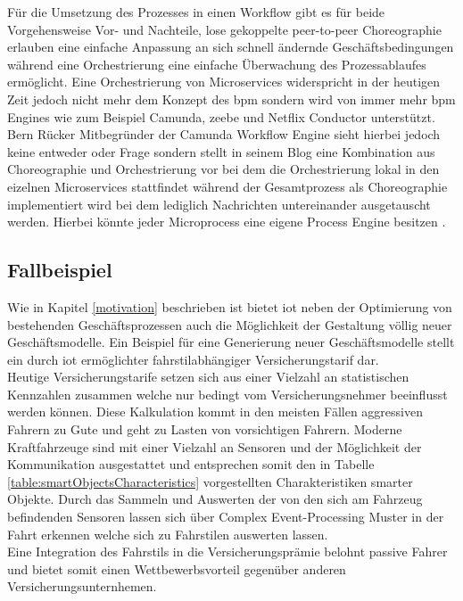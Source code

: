 \documentclass[a4paper, 12pt, twoside, headsepline=true]{scrartcl} %
\begin{document}
Für die Umsetzung des Prozesses in einen Workflow gibt es für beide Vorgehensweise Vor- und Nachteile, lose gekoppelte peer-to-peer Choreographie erlauben eine einfache Anpassung an sich schnell ändernde Geschäftsbedingungen während eine Orchestrierung eine einfache Überwachung des Prozessablaufes ermöglicht\cite{orchVSchoreo}. Eine Orchestrierung von Microservices widerspricht in der heutigen Zeit jedoch nicht mehr dem Konzept des \ac{bpm} sondern wird von  immer mehr \ac{bpm} Engines wie zum Beispiel Camunda\cite{camundamicroservices}, zeebe\cite{zeebeio} und Netflix Conductor\cite{conductor} unterstützt.\\
Bern Rücker Mitbegründer der Camunda Workflow Engine sieht hierbei jedoch keine entweder oder Frage sondern stellt in seinem Blog eine Kombination aus Choreographie und Orchestrierung vor bei dem die Orchestrierung lokal in den eizelnen Microservices stattfindet während der Gesamtprozess als Choreographie implementiert wird bei dem lediglich Nachrichten untereinander ausgetauscht werden\cite{orchandchoreo}. Hierbei könnte jeder Microprocess eine eigene Process Engine besitzen \cite{bpmmonolith}.\\

\subsection{Fallbeispiel}
Wie in Kapitel \ref{motivation} beschrieben ist bietet \ac{iot} neben der Optimierung von bestehenden Geschäftsprozessen auch die Möglichkeit der Gestaltung völlig neuer Geschäftsmodelle. Ein Beispiel für eine Generierung neuer Geschäftsmodelle stellt ein durch \ac{iot} ermöglichter fahrstilabhängiger Versicherungstarif dar.\\
Heutige Versicherungstarife setzen sich aus einer Vielzahl an statistischen Kennzahlen zusammen welche nur bedingt vom Versicherungsnehmer beeinflusst werden können. Diese Kalkulation kommt in den meisten Fällen aggressiven Fahrern zu Gute und geht zu Lasten von vorsichtigen Fahrern. Moderne Kraftfahrzeuge sind mit einer Vielzahl an Sensoren und der Möglichkeit der Kommunikation ausgestattet und entsprechen somit den in Tabelle \ref{table:smartObjectsCharacteristics} vorgestellten Charakteristiken smarter Objekte. Durch das Sammeln und Auswerten der von den sich am Fahrzeug befindenden Sensoren lassen sich über Complex Event-Processing Muster in der Fahrt erkennen welche sich zu Fahrstilen auswerten lassen.\\
Eine Integration des Fahrstils in die Versicherungsprämie belohnt passive Fahrer und bietet somit einen Wettbewerbsvorteil gegenüber anderen Versicherungsunternhemen.\\
\end{document}
